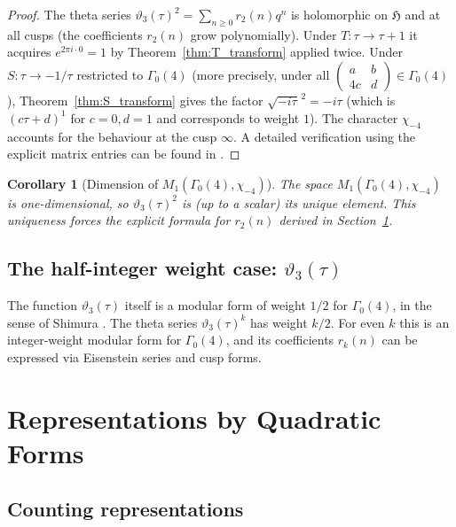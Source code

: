\documentclass[12pt,a4paper]{amsart}
\newtheorem{corollary}[theorem]{Corollary}
\theoremstyle{definition}
\begin{document}
\begin{proof}
The theta series $\vartheta_3(\tau)^2 = \sum_{n\geq 0} r_2(n) q^n$
is holomorphic on $\mathfrak{H}$ and at all cusps (the coefficients $r_2(n)$
grow polynomially).  Under $T: \tau\to\tau+1$ it acquires $e^{2\pi i \cdot 0} = 1$
by Theorem~\ref{thm:T_transform} applied twice.
Under $S: \tau \to -1/\tau$ restricted to $\Gamma_0(4)$ (more precisely, under
all $\begin{pmatrix}a&b\\4c&d\end{pmatrix}\in\Gamma_0(4)$),
Theorem~\ref{thm:S_transform} gives the factor $\sqrt{-i\tau}^{\,2} = -i\tau$
(which is $(c\tau+d)^1$ for $c=0,d=1$ and corresponds to weight $1$).
The character $\chi_{-4}$ accounts for the behaviour at the cusp $\infty$.
A detailed verification using the explicit matrix entries can be found in \cite{Iwaniec1997}.
\end{proof}

\begin{corollary}[Dimension of $M_1(\Gamma_0(4),\chi_{-4})$]
The space $M_1(\Gamma_0(4),\chi_{-4})$ is one-dimensional, so
$\vartheta_3(\tau)^2$ is (up to a scalar) its unique element.
This uniqueness forces the explicit formula for $r_2(n)$ derived in Section~\ref{sec:quadratic}.
\end{corollary}

\subsection{The half-integer weight case: $\vartheta_3(\tau)$}

The function $\vartheta_3(\tau)$ itself is a modular form of weight $1/2$
for $\Gamma_0(4)$, in the sense of Shimura \cite{Shimura1973}.
The theta series $\vartheta_3(\tau)^k$ has weight $k/2$.
For even $k$ this is an integer-weight modular form for $\Gamma_0(4)$,
and its coefficients $r_k(n)$ can be expressed via Eisenstein series and cusp forms.

\section{Representations by Quadratic Forms}\label{sec:quadratic}

\subsection{Counting representations}
\end{document}
